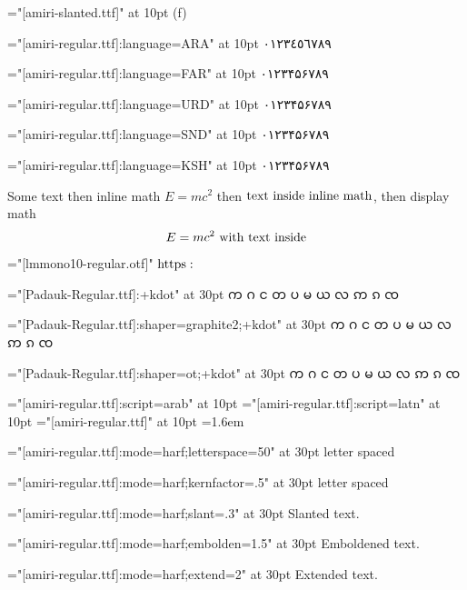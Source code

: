 \font\amiriteni="[amiri-slanted.ttf]" at 10pt
({\amiriteni f\/})

\def\l#1#2{%
  \begingroup%
  \font\testl="[amiri-regular.ttf]:language=#1" at 10pt
  \testl #2%
  \endgroup%
}
\l{ARA}{٠١٢٣٤٥٦٧٨٩}\par
\l{FAR}{۰۱۲۳۴۵۶۷۸۹}\par
\l{URD}{۰۱۲۳۴۵۶۷۸۹}\par
\l{SND}{۰۱۲۳۴۵۶۷۸۹}\par
\l{KSH}{۰۱۲۳۴۵۶۷۸۹}\par

Some text then inline math $E=mc^2$ then $\hbox{text inside inline math}$, then
display math $$E=mc^2\hbox{ with text inside}$$

\begingroup
\font\lmmono="[lmmono10-regular.otf]"
\lmmono $\fam0 \textfont0\font https:$
\endgroup

\font\padauk="[Padauk-Regular.ttf]:+kdot" at 30pt\padauk
က ဂ င တ ပ မ ယ လ ဢ ၵ ၸ \par
\font\padauk="[Padauk-Regular.ttf]:shaper=graphite2;+kdot" at 30pt\padauk
က ဂ င တ ပ မ ယ လ ဢ ၵ ၸ \par
\font\padauk="[Padauk-Regular.ttf]:shaper=ot;+kdot"        at 30pt\padauk
က ဂ င တ ပ မ ယ လ ဢ ၵ ၸ \par


\font\arab="[amiri-regular.ttf]:script=arab" at 10pt\arab
\font\latn="[amiri-regular.ttf]:script=latn" at 10pt\latn
\font\dflt="[amiri-regular.ttf]" at 10pt\dflt
\baselineskip=1.6em

\font{}="[amiri-regular.ttf]:mode=harf;letterspace=50" at 30pt
letter spaced

\font{}="[amiri-regular.ttf]:mode=harf;kernfactor=.5" at 30pt
letter spaced

\font\slanted="[amiri-regular.ttf]:mode=harf;slant=.3" at 30pt\slanted
Slanted text.

\font\embolden="[amiri-regular.ttf]:mode=harf;embolden=1.5" at 30pt\embolden
Emboldened text.

\font\extend="[amiri-regular.ttf]:mode=harf;extend=2" at 30pt\extend
Extended text.

